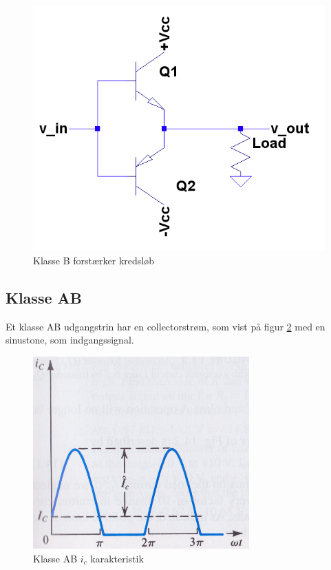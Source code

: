 \begin{figure}[h]
\centering
\includegraphics[scale=.35]{indledende_analyse/klasser/classb.png}
\caption{Klasse B forstærker kredsløb}
\label{fig:classb}
\end{figure}

\subsection{Klasse AB}

Et klasse AB udgangstrin har en collectorstrøm, som vist på figur \ref{fig:klasseab} med en sinustone, som indgangssignal. 

\begin{figure}[h]
\centering
\includegraphics[scale=.35]{indledende_analyse/klasser/klasseab.png}
\caption{Klasse AB $i_c$ karakteristik}
\label{fig:klasseab}
\end{figure}

